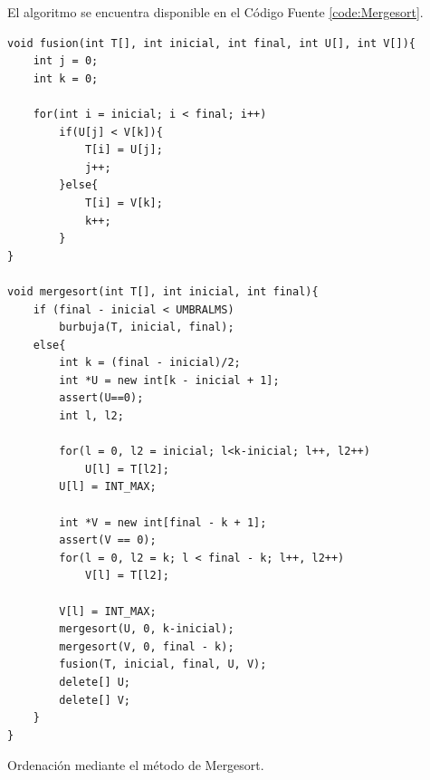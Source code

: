 \documentclass[12pt]{article}
\begin{document}
    El algoritmo se encuentra disponible en el Código Fuente \ref{code:Mergesort}.
    \begin{listing}
        \begin{verbatim}
void fusion(int T[], int inicial, int final, int U[], int V[]){
    int j = 0;
    int k = 0;

    for(int i = inicial; i < final; i++)
        if(U[j] < V[k]){
            T[i] = U[j];
            j++;
        }else{
            T[i] = V[k];
            k++;
        }
}

void mergesort(int T[], int inicial, int final){
    if (final - inicial < UMBRALMS)
        burbuja(T, inicial, final);
    else{
        int k = (final - inicial)/2;
        int *U = new int[k - inicial + 1];
        assert(U==0);
        int l, l2;

        for(l = 0, l2 = inicial; l<k-inicial; l++, l2++)
            U[l] = T[l2];
        U[l] = INT_MAX;

        int *V = new int[final - k + 1];
        assert(V == 0);
        for(l = 0, l2 = k; l < final - k; l++, l2++)
            V[l] = T[l2];

        V[l] = INT_MAX;
        mergesort(U, 0, k-inicial);
        mergesort(V, 0, final - k);
        fusion(T, inicial, final, U, V);
        delete[] U;
        delete[] V;
    }
}
    \end{verbatim}
    \caption{Ordenación mediante el método de Mergesort.}
    \label{code:Mergesort}
    \end{listing}
\end{document}
